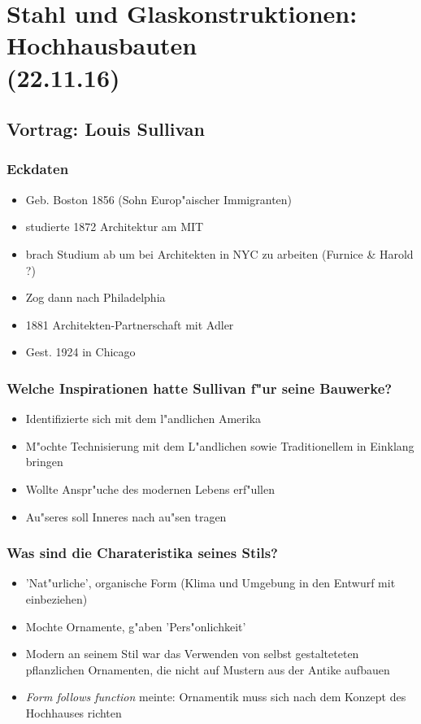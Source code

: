 \documentclass[emulatestandardclasses]{scrartcl}
\begin{document}
\section{Stahl und Glaskonstruktionen: Hochhausbauten\\(22.11.16)}

\subsection{Vortrag: Louis Sullivan}

\subsubsection{Eckdaten}

\begin{itemize}
  \item Geb. Boston 1856 (Sohn Europ"aischer Immigranten) 
  \item studierte 1872 Architektur am MIT
  \item brach Studium ab um bei Architekten in NYC zu arbeiten (Furnice \& Harold ?)
  \item Zog dann nach Philadelphia
  \item 1881 Architekten-Partnerschaft mit Adler
  \item Gest. 1924 in Chicago
\end{itemize}

\subsubsection{Welche Inspirationen hatte Sullivan f"ur seine Bauwerke?}

\begin{itemize}
  \item Identifizierte sich mit dem l"andlichen Amerika
  \item M"ochte Technisierung mit dem L"andlichen sowie Traditionellem in Einklang bringen
  \item Wollte Anspr"uche des modernen Lebens erf"ullen
  \item Au"seres soll Inneres nach au"sen tragen
\end{itemize}

\subsubsection{Was sind die Charateristika seines Stils?}

\begin{itemize}
  \item 'Nat"urliche', organische Form (Klima und Umgebung in den Entwurf mit einbeziehen)
  \item Mochte Ornamente, g"aben 'Pers"onlichkeit'
  \item Modern an seinem Stil war das Verwenden von selbst gestalteteten pflanzlichen Ornamenten, die nicht auf Mustern aus der Antike aufbauen
  \item \emph{Form follows function} meinte: Ornamentik muss sich nach dem Konzept des Hochhauses richten
\end{itemize}
\end{document}
